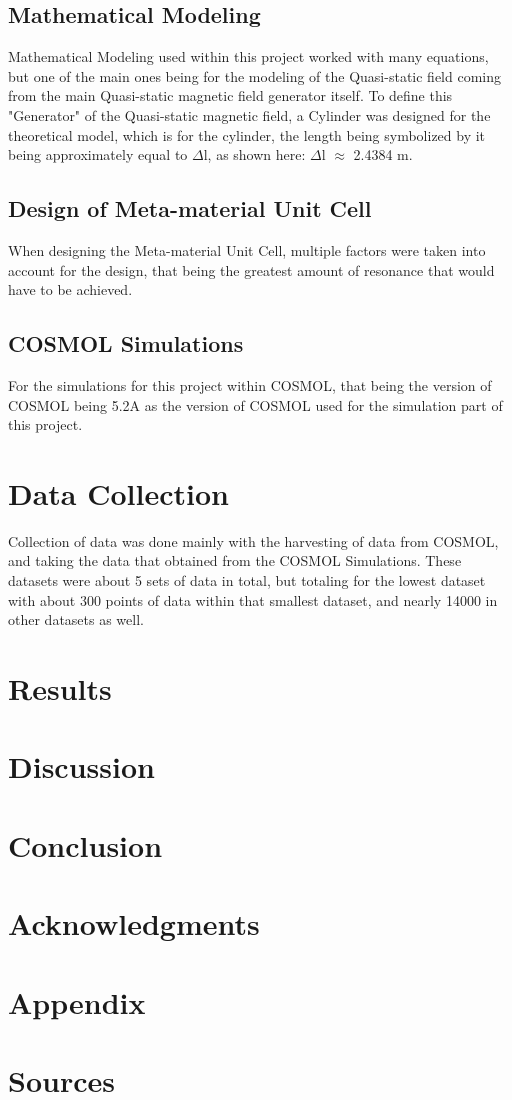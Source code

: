 \documentclass[]{article}
\begin{document}
\subsection{Mathematical Modeling}
Mathematical Modeling used within this project worked with many equations, but one of the main ones being for the modeling of the Quasi-static field coming from the main Quasi-static magnetic field generator itself. To define this "Generator" of the Quasi-static magnetic field, a Cylinder was designed for the theoretical model, which is for the cylinder, the length being symbolized by it being approximately equal to $\Delta$l, as shown here: $\Delta$l $\approx$ 2.4384 m.
\subsection{Design of Meta-material Unit Cell}
When designing the Meta-material Unit Cell, multiple factors were taken into account for the design, that being the greatest amount of resonance that would have to be achieved. 
\subsection{COSMOL Simulations}
For the simulations for this project within COSMOL, that being the version of COSMOL being 5.2A as the version of COSMOL used for the simulation part of this project.

\section{Data Collection}
Collection of data was done mainly with the harvesting of data from COSMOL, and taking the data that obtained from the COSMOL Simulations. These datasets were about 5 sets of data in total, but totaling for the lowest dataset with about 300 points of data within that smallest dataset, and nearly 14000 in other datasets as well.

\section{Results}

\section{Discussion}

\section{Conclusion}

\section{Acknowledgments}

\section{Appendix}

\section{Sources}
\end{document}
